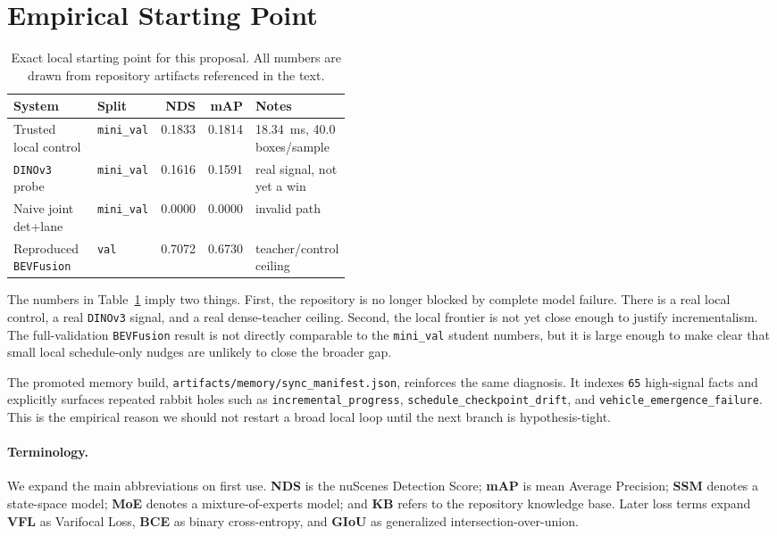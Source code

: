 \documentclass[11pt]{article}
\newcommand{\repo}[1]{\texttt{\nolinkurl{#1}}}
\begin{document}
\section{Empirical Starting Point}
\begin{table}[t]
\centering
\caption{Exact local starting point for this proposal. All numbers are drawn from repository
artifacts referenced in the text.}
\label{tab:starting-point}
\begin{tabularx}{\linewidth}{>{\raggedright\arraybackslash}p{0.31\linewidth} >{\raggedright\arraybackslash}p{0.13\linewidth} r r >{\raggedright\arraybackslash}X}
\toprule
System & Split & NDS & mAP & Notes \\
\midrule
Trusted local control & \texttt{mini\_val} & 0.1833 & 0.1814 & \SI{18.34}{ms}, 40.0 boxes/sample \\
\texttt{DINOv3} probe & \texttt{mini\_val} & 0.1616 & 0.1591 & real signal, not yet a win \\
Naive joint det+lane & \texttt{mini\_val} & 0.0000 & 0.0000 & invalid path \\
Reproduced \texttt{BEVFusion} & \texttt{val} & 0.7072 & 0.6730 & teacher/control ceiling \\
\bottomrule
\end{tabularx}
\end{table}

The numbers in Table~\ref{tab:starting-point} imply two things. First, the repository is no longer
blocked by complete model failure. There is a real local control, a real \texttt{DINOv3} signal,
and a real dense-teacher ceiling. Second, the local frontier is not yet close enough to justify
incrementalism. The full-validation \texttt{BEVFusion} result is not directly comparable to the
\texttt{mini\_val} student numbers, but it is large enough to make clear that small local
schedule-only nudges are unlikely to close the broader gap.

The promoted memory build,
\repo{artifacts/memory/sync\_manifest.json}, reinforces the same diagnosis. It indexes \texttt{65}
high-signal facts and explicitly surfaces repeated rabbit holes such as
\repo{incremental\_progress}, \repo{schedule\_checkpoint\_drift}, and
\repo{vehicle\_emergence\_failure}. This is the empirical reason we should not restart a broad
local loop until the next branch is hypothesis-tight.

\paragraph{Terminology.}
We expand the main abbreviations on first use. \textbf{NDS} is the nuScenes Detection Score;
\textbf{mAP} is mean Average Precision; \textbf{SSM} denotes a state-space model; \textbf{MoE}
denotes a mixture-of-experts model; and \textbf{KB} refers to the repository knowledge base. Later
loss terms expand \textbf{VFL} as Varifocal Loss, \textbf{BCE} as binary cross-entropy, and
\textbf{GIoU} as generalized intersection-over-union.
\end{document}
